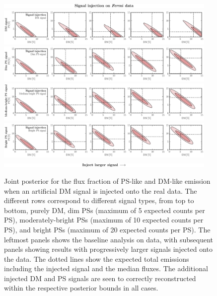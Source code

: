 \documentclass[prd,aps,10pt,nofootinbib,twocolumn,superscriptaddress,preprintnumbers,balancelastpage,longbibliography,floatfix]{revtex4-2}
\begin{document}
%
\begin{figure}[!htbp]
\centering
\includegraphics[width=0.95\textwidth]{sig_inj_title.pdf}
\includegraphics[width=0.95\textwidth]{data_sig_inj_dm.pdf}
\includegraphics[width=0.95\textwidth]{data_sig_inj_dim_ps.pdf}
\includegraphics[width=0.95\textwidth]{data_sig_inj_med_ps.pdf}
\includegraphics[width=0.95\textwidth]{data_sig_inj_ps.pdf}
\includegraphics[width=0.95\textwidth]{sig_inj_chyron.pdf}
\caption{Joint posterior for the flux fraction of PS-like and DM-like emission when an artificial DM signal is injected onto the real \Fermi data. The different rows correspond to different signal types, from top to bottom, purely DM, dim PSs (maximum of 5 expected counts per PS), moderately-bright PSs (maximum of 10 expected counts per PS), and bright PSs (maximum of 20 expected counts per PS). The leftmost panels shows the baseline analysis on \Fermi data, with subsequent panels showing results with progressively larger signals injected onto the data. The dotted lines show the expected total emissions including the injected signal and the median fluxes. The additional injected DM and PS signals are seen to correctly reconstructed within the respective posterior bounds in all cases.}
\label{fig:sig_inj_data}
\end{figure}
%
\end{document}
